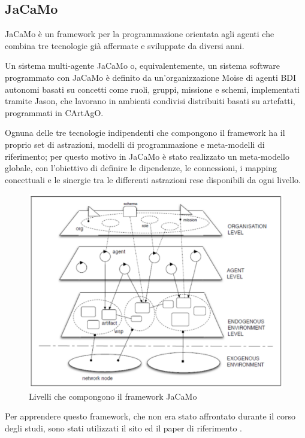 \subsection{JaCaMo}

JaCaMo è un framework per la programmazione orientata agli agenti che combina tre tecnologie già affermate e sviluppate da diversi anni.

\medskip

Un sistema multi-agente JaCaMo o, equivalentemente, un sistema software programmato con JaCaMo è definito da un'organizzazione Moise di agenti BDI autonomi basati su concetti come ruoli, gruppi, missione e schemi, implementati tramite Jason, che lavorano in ambienti condivisi distribuiti basati su artefatti, programmati in CArtAgO.

\medskip

Ognuna delle tre tecnologie indipendenti che compongono il framework ha il proprio set di astrazioni, modelli di programmazione e meta-modelli di riferimento; per questo motivo in JaCaMo è stato realizzato un meta-modello globale, con l'obiettivo di definire le dipendenze, le connessioni, i mapping concettuali e le sinergie tra le differenti astrazioni rese disponibili da ogni livello.\cite{BOISSIER2013747}

\begin{figure}[H]
\centering
\includegraphics[width=\textwidth]{figures/JaCaMo_levels.png}
\caption{Livelli che compongono il framework JaCaMo\cite{BOISSIER2013747}}
\end{figure}

Per apprendere questo framework, che non era stato affrontato durante il corso degli studi, sono stati utilizzati il sito \cite{jacamo} ed il paper di riferimento \cite{BOISSIER2013747}. 

